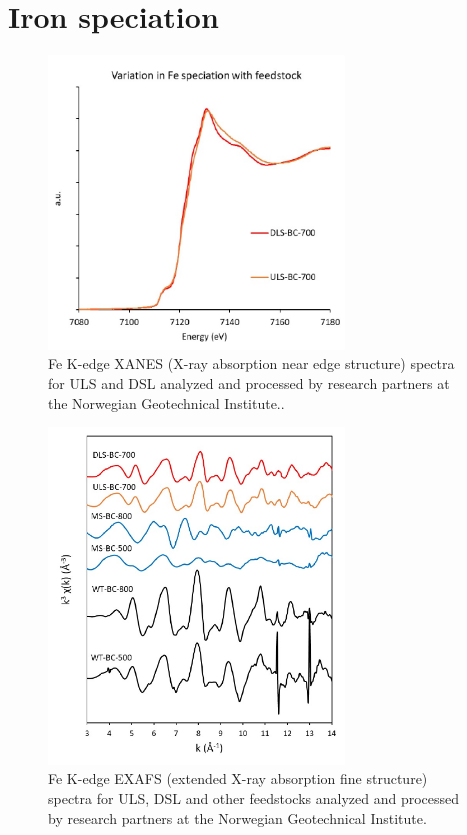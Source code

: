 \chapter{Iron speciation}\label{appSec:Fe}

\begin{figure}[ht]
    \centering
    \includegraphics[width=0.7\textwidth]{Diagrams/Valence.pdf}
    \caption{Fe K-edge XANES (X-ray absorption near edge structure) spectra for ULS and DSL analyzed and processed by research partners at the Norwegian Geotechnical Institute..}
    \label{appFig:valence}
\end{figure}

\begin{figure}[ht]
    \centering
    \includegraphics[width=0.7\textwidth]{Diagrams/Fe_species.pdf}
    \caption{Fe K-edge EXAFS (extended X-ray absorption fine structure) spectra for ULS, DSL and other feedstocks analyzed and processed by research partners at the Norwegian Geotechnical Institute.}
    \label{appFig:Fe_species}
\end{figure}